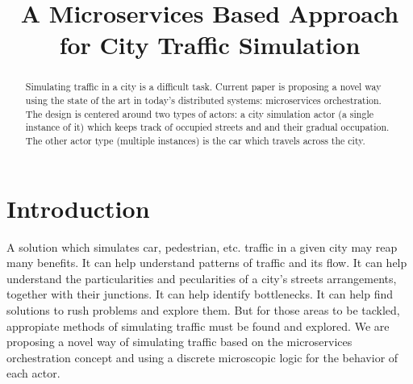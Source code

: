 \documentclass[conference]{IEEEtran}
\begin{document}
\title{A Microservices Based Approach for City Traffic Simulation}

\author{
    \and
}

\maketitle

\begin{abstract}

Simulating traffic in a city is a difficult task. Current paper is proposing a novel way using the state of the art in today's distributed systems: microservices orchestration. The design is centered around two types of actors: a city simulation actor (a single instance of it) which keeps track of occupied streets and and their gradual occupation. The other actor type (multiple instances) is the car which travels across the city.

\end{abstract}

\section{Introduction}

A solution which simulates car, pedestrian, etc. traffic in a given city may reap many benefits. It can help understand patterns of traffic and its flow. It can help understand the particularities and pecularities of a city's streets arrangements, together with their junctions. It can help identify bottlenecks. It can help find solutions to rush problems and explore them. But for those areas to be tackled, appropiate methods of simulating traffic must be found and explored. We are proposing a novel way of simulating traffic based on the microservices orchestration concept and using a discrete microscopic logic for the behavior of each actor.
\end{document}
